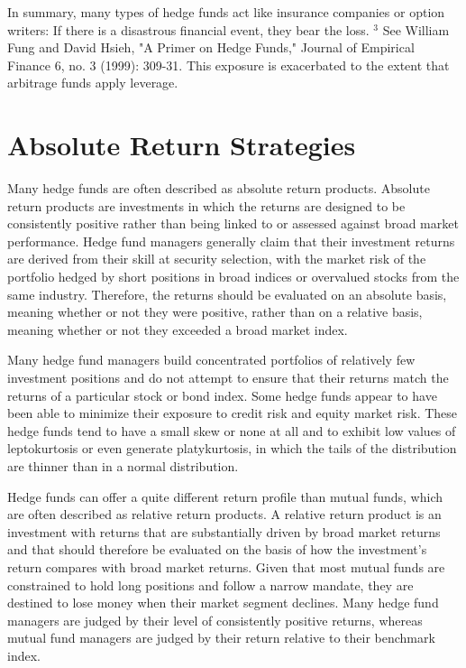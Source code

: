 \documentclass[11pt]{article}
\begin{document}
In summary, many types of hedge funds act like insurance companies or option writers: If there is a disastrous financial event, they bear the loss. ${ }^{3}$ See William Fung and David Hsieh, "A Primer on Hedge Funds," Journal of Empirical Finance 6, no. 3 (1999): 309-31. This exposure is exacerbated to the extent that arbitrage funds apply leverage.

\section*{Absolute Return Strategies}
Many hedge funds are often described as absolute return products. Absolute return products are investments in which the returns are designed to be consistently positive rather than being linked to or assessed against broad market performance. Hedge fund managers generally claim that their investment returns are derived from their skill at security selection, with the market risk of the portfolio hedged by short positions in broad indices or overvalued stocks from the same industry. Therefore, the returns should be evaluated on an absolute basis, meaning whether or not they were positive, rather than on a relative basis, meaning whether or not they exceeded a broad market index.

Many hedge fund managers build concentrated portfolios of relatively few investment positions and do not attempt to ensure that their returns match the returns of a particular stock or bond index. Some hedge funds appear to have been able to minimize their exposure to credit risk and equity market risk. These hedge funds tend to have a small skew or none at all and to exhibit low values of leptokurtosis or even generate platykurtosis, in which the tails of the distribution are thinner than in a normal distribution.

Hedge funds can offer a quite different return profile than mutual funds, which are often described as relative return products. A relative return product is an investment with returns that are substantially driven by broad market returns and that should therefore be evaluated on the basis of how the investment's return compares with broad market returns. Given that most mutual funds are constrained to hold long positions and follow a narrow mandate, they are destined to lose money when their market segment declines. Many hedge fund managers are judged by their level of consistently positive returns, whereas mutual fund managers are judged by their return relative to their benchmark index.
\end{document}
